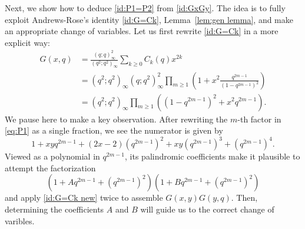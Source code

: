 \documentclass[11pt,reqno]{amsart}
\numberwithin{equation}{section}
\theoremstyle{plain}
\theoremstyle{definition}
\theoremstyle{named}
\begin{document}
Next, we show how to deduce \eqref{id:P1=P2} from \eqref{id:GxGy}. The idea is to fully exploit Andrews-Rose's identity \eqref{id:G=Ck}, Lemma~\ref{lem:gen lemma}, and make an appropriate change of variables. Let us first rewrite \eqref{id:G=Ck} in a more explicit way:
\begin{align}
G(x,q) &= \frac{(q;q)^2_{\infty}}{(q^2;q^2)_\infty}\sum_{k\ge 0}C_k(q)x^{2k}\nonumber \\
&= (q^2;q^2)_{\infty}(q;q^2)^2_{\infty}\prod_{m\ge 1}\left(1+x^2\frac{q^{2m-1}}{(1-q^{2m-1})^2}\right)\nonumber \\
&= (q^2;q^2)_{\infty}\prod_{m\ge 1}\left((1-q^{2m-1})^2+x^2q^{2m-1}\right).
\label{id:G=Ck new}
\end{align}
We pause here to make a key observation. After rewriting the $m$-th factor in \eqref{eq:P1} as a single fraction, we see the numerator is given by $$1+xyq^{2m-1}+(2x-2)(q^{2m-1})^2+xy(q^{2m-1})^3+(q^{2m-1})^4.$$ 
Viewed as a polynomial in $q^{2m-1}$, its palindromic coefficients make it plausible to attempt the factorization
$$(1+Aq^{2m-1}+(q^{2m-1})^2)(1+Bq^{2m-1}+(q^{2m-1})^2)$$
and apply \eqref{id:G=Ck new} twice to assemble $G(x,y)G(y,q)$. Then, determining the coefficients $A$ and $B$ will guide us to the correct change of varibles. 
\end{document}
